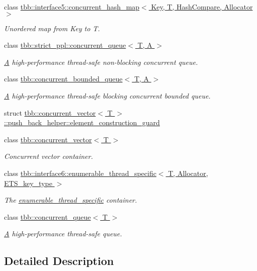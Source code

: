 \begin{DoxyCompactItemize}
class \hyperlink{classtbb_1_1interface5_1_1concurrent__hash__map}{tbb\+::interface5\+::concurrent\+\_\+hash\+\_\+map$<$ Key, T, Hash\+Compare, Allocator $>$}
\begin{DoxyCompactList}\small\item\em Unordered map from Key to T. \end{DoxyCompactList}\item 
class \hyperlink{classtbb_1_1strict__ppl_1_1concurrent__queue}{tbb\+::strict\+\_\+ppl\+::concurrent\+\_\+queue$<$ T, A $>$}
\begin{DoxyCompactList}\small\item\em \hyperlink{structA}{A} high-\/performance thread-\/safe non-\/blocking concurrent queue. \end{DoxyCompactList}\item 
class \hyperlink{classtbb_1_1concurrent__bounded__queue}{tbb\+::concurrent\+\_\+bounded\+\_\+queue$<$ T, A $>$}
\begin{DoxyCompactList}\small\item\em \hyperlink{structA}{A} high-\/performance thread-\/safe blocking concurrent bounded queue. \end{DoxyCompactList}\item 
struct \hyperlink{structtbb_1_1concurrent__vector_1_1push__back__helper_1_1element__construction__guard}{tbb\+::concurrent\+\_\+vector$<$ T $>$\+::push\+\_\+back\+\_\+helper\+::element\+\_\+construction\+\_\+guard}
\item 
class \hyperlink{classtbb_1_1concurrent__vector}{tbb\+::concurrent\+\_\+vector$<$ T $>$}
\begin{DoxyCompactList}\small\item\em Concurrent vector container. \end{DoxyCompactList}\item 
class \hyperlink{classtbb_1_1interface6_1_1enumerable__thread__specific}{tbb\+::interface6\+::enumerable\+\_\+thread\+\_\+specific$<$ T, Allocator, E\+T\+S\+\_\+key\+\_\+type $>$}
\begin{DoxyCompactList}\small\item\em The \hyperlink{classtbb_1_1interface6_1_1enumerable__thread__specific}{enumerable\+\_\+thread\+\_\+specific} container. \end{DoxyCompactList}\item 
class \hyperlink{classtbb_1_1concurrent__queue}{tbb\+::concurrent\+\_\+queue$<$ T $>$}
\begin{DoxyCompactList}\small\item\em \hyperlink{structA}{A} high-\/performance thread-\/safe queue. \end{DoxyCompactList}\end{DoxyCompactItemize}


\subsection{Detailed Description}
